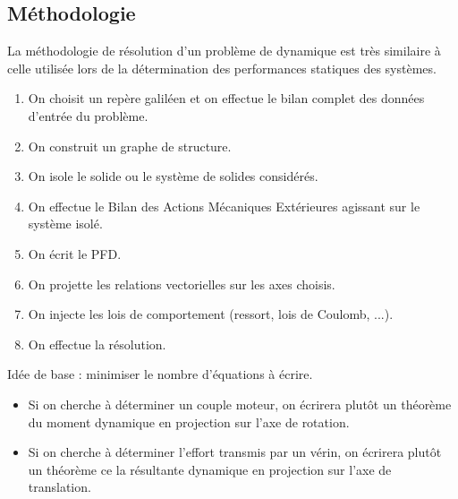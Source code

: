 \subsection{Méthodologie}

\begin{methode}
La méthodologie de résolution d'un problème de dynamique est très similaire à celle utilisée lors de la détermination des performances statiques des systèmes.

\begin{enumerate}
\item On choisit un repère galiléen et on effectue le bilan complet des données d'entrée du problème.
\item On construit un graphe de structure.
\item On isole le solide ou le système de solides considérés.
\item On effectue le Bilan des Actions Mécaniques Extérieures agissant sur le système isolé.
\item On écrit le PFD.
\item On projette les relations vectorielles sur les axes choisis.
\item On injecte les lois de comportement (ressort, lois de Coulomb, ...).
\item On effectue la résolution.
\end{enumerate}
\end{methode}

\begin{methode}

Idée de base : minimiser le nombre d'équations à écrire. 
\begin{itemize}
\item Si on cherche à déterminer un couple moteur, on écrirera plutôt un théorème du moment dynamique en projection sur l'axe de rotation.
\item Si on cherche à déterminer l'effort transmis par un vérin, on écrirera plutôt un théorème ce la résultante dynamique en projection sur l'axe de translation.
\end{itemize}

\end{methode}



